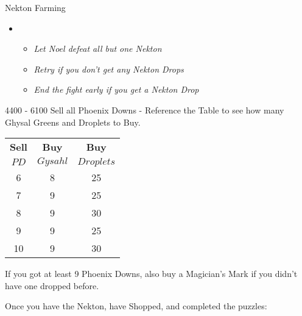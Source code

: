 \begin{battle}{Nekton Farming}
\begin{itemize}
	\item \first
	\begin{itemize}
		\item \textit{Let Noel defeat all but one Nekton}
		\item \textit{Retry if you don't get any Nekton Drops}
		\item \textit{End the fight early if you get a Nekton Drop}
	\end{itemize}
\end{itemize}
\end{battle}



\begin{shop}{4400 - 6100}
Sell all Phoenix Downs - Reference the Table to see how many Ghysal Greens and Droplets to Buy.
\begin{center}
\begin{tabular}{c|c|c}
	\textbf{Sell} & \textbf{Buy} & \textbf{Buy}\\
	$PD$ & $Gysahl$ & $Droplets$ \\
	\hline
	6 & 8 & 25\\
	7 & 9 & 25\\
	8 & 9 & 30\\
	9 & 9 & 25\\
	10 & 9 & 30\\
\end{tabular}
\end{center}

If you got at least 9 Phoenix Downs, also buy a Magician's Mark if you didn't have one dropped before.
\end{shop}

Once you have the Nekton, have Shopped, and completed the puzzles:

